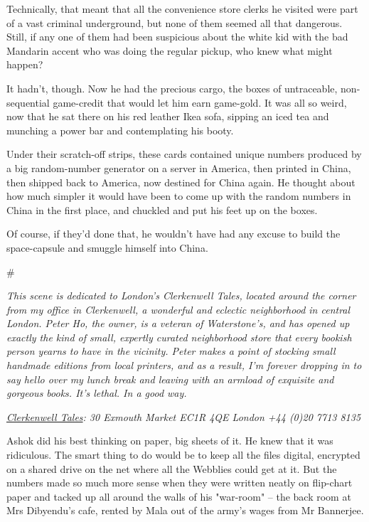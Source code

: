 Technically, that meant that all the convenience store clerks he
visited were part of a vast criminal underground, but none of them
seemed all that dangerous. Still, if any one of them had been
suspicious about the white kid with the bad Mandarin accent who was
doing the regular pickup, who knew what might happen?

It hadn't, though. Now he had the precious cargo, the boxes of
untraceable, non-sequential game-credit that would let him earn
game-gold. It was all so weird, now that he sat there on his red
leather Ikea sofa, sipping an iced tea and munching a power bar and
contemplating his booty.

Under their scratch-off strips, these cards contained unique
numbers produced by a big random-number generator on a server in
America, then printed in China, then shipped back to America, now
destined for China again. He thought about how much simpler it
would have been to come up with the random numbers in China in the
first place, and chuckled and put his feet up on the boxes.

Of course, if they'd done that, he wouldn't have had any excuse to
build the space-capsule and smuggle himself into China.

\#

\emph{This scene is dedicated to London's Clerkenwell Tales, located around the corner from my office in Clerkenwell, a wonderful and eclectic neighborhood in central London. Peter Ho, the owner, is a veteran of Waterstone's, and has opened up exactly the kind of small, expertly curated neighborhood store that every bookish person yearns to have in the vicinity. Peter makes a point of stocking small handmade editions from local printers, and as a result, I'm forever dropping in to say hello over my lunch break and leaving with an armload of exquisite and gorgeous books. It's lethal. In a good way.}

\emph{\href{http://www.clerkenwell-tales.co.uk/}{Clerkenwell Tales}: 30 Exmouth Market EC1R 4QE London +44 (0)20 7713 8135}

Ashok did his best thinking on paper, big sheets of it. He knew
that it was ridiculous. The smart thing to do would be to keep all
the files digital, encrypted on a shared drive on the net where all
the Webblies could get at it. But the numbers made so much more
sense when they were written neatly on flip-chart paper and tacked
up all around the walls of his "war-room" -- the back room at Mrs
Dibyendu's cafe, rented by Mala out of the army's wages from Mr
Bannerjee.

